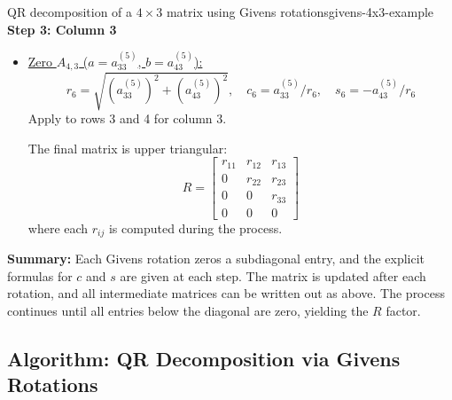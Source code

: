 \begin{example}{QR decomposition of a $4\times3$ matrix using Givens rotations}{givens-4x3-example}
    \textbf{Step 3: Column 3}

    \begin{itemize}
        \item \underline{Zero $A_{4,3}$ ($a=a_{33}^{(5)}$, $b=a_{43}^{(5)}$):}
        \[
            r_6 = \sqrt{(a_{33}^{(5)})^2 + (a_{43}^{(5)})^2}, \quad c_6 = a_{33}^{(5)}/r_6, \quad s_6 = -a_{43}^{(5)}/r_6
        \]
        Apply to rows 3 and 4 for column 3.

        The final matrix is upper triangular:
        \[
            R = \begin{bmatrix}
                r_{11} & r_{12} & r_{13} \\
                0      & r_{22} & r_{23} \\
                0      & 0      & r_{33} \\
                0      & 0      & 0
            \end{bmatrix}
        \]
        where each $r_{ij}$ is computed during the process.
    \end{itemize}

    \textbf{Summary:}
    Each Givens rotation zeros a subdiagonal entry, and the explicit formulas for $c$ and $s$ are given at each step. The matrix is updated after each rotation, and all intermediate matrices can be written out as above. The process continues until all entries below the diagonal are zero, yielding the $R$ factor.
\end{example}

\subsection{Algorithm: QR Decomposition via Givens Rotations}


